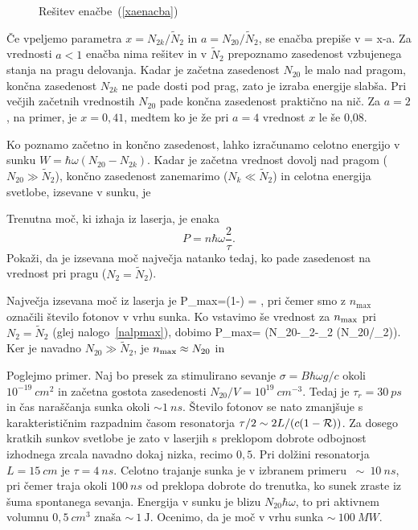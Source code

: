 \begin{figure}[h]
\centering
\def\svgwidth{90truemm} 

\caption{Rešitev enačbe~(\ref{xaenacba})}
\label{fig:Qeq}
\end{figure}

Če vpeljemo parametra $x=N_{2k}/\tilde{N}_2$ in $a=N_{20}/\tilde{N}_{2}$, se
enačba prepiše v 
\beq
\ln {}= x-a.
\eeq
Za vrednosti $a<1$ enačba nima rešitev in 
v $\tilde{N}_{2}$ prepoznamo zasedenost vzbujenega stanja na pragu delovanja. Kadar je začetna 
zasedenost $N_{20}$ le malo nad pragom, končna zasedenost $N_{2k}$ ne pade 
dosti pod prag, zato je izraba energije slabša. Pri večjih začetnih vrednostih 
$N_{20}$ pade končna zasedenost praktično na nič. Za $a=2$, na primer,
je $x=0,41$, medtem ko je že pri $a=4$ vrednost $x$ le še 0,08. 

Ko poznamo začetno in končno zasedenost, lahko izračunamo 
celotno energijo v sunku $W=\hbar \omega (N_{20}-N_{2k})$. Kadar je začetna vrednost
dovolj nad pragom ($N_{20}\gg\tilde{N}_{2}$), končno zasedenost zanemarimo ($N_{k}\ll\tilde{N}_{2}$) in 
celotna energija svetlobe, izsevane v sunku, je 
\begin{definition}
\label{nalpmax}
Trenutna moč, ki izhaja iz laserja, je enaka 
\begin{equation}
P=n \hbar \omega \frac{2}{\tau}.
\end{equation}
Pokaži, da je izsevana moč največja natanko tedaj, ko pade zasedenost na vrednost pri 
pragu ($N_{2}=\tilde{N}_{2}$). 
\end{definition}

Največja izsevana moč iz laserja je 
\beq
P_{\rm max}=\left(1-\right) = 
,
\eeq
pri čemer smo z $n_\textrm{max}$ označili število fotonov v vrhu sunka. 
Ko vstavimo še vrednost za $n_{\rm max}$ pri $N_{2}=\tilde{N}_{2}$ (glej 
nalogo~\ref{nalpmax}), dobimo
\beq
P_{\rm max}=\frac {2\hbar \omega}{\tau} \left(N_{20}-_{2}-_{2}
\ln (N_{20}/_{2})\right).
\eeq
Ker je navadno $N_{20}\gg \tilde{N}_2$, je $n_{\rm max} \approx N_{20}$
in 

Poglejmo primer. Naj bo presek za stimulirano sevanje $\sigma=B\hbar \omega g/c$ 
okoli $10^{-19}~\si{cm}^{2}$ in začetna gostota zasedenosti $N_{20}/V=10^{19}~\si{cm}^{-3}$.
Tedaj je $\tau_{r}=30~\si{ps}$ in čas naraščanja
sunka okoli $\sim 1~\si{ns}$. Število fotonov se nato zmanjšuje s
karakterističnim razpadnim časom resonatorja $\tau /2\sim 2L/(c(1-{\cal R}))$. 
Za dosego kratkih sunkov svetlobe je zato v laserjih s preklopom dobrote odbojnost 
izhodnega zrcala navadno dokaj nizka, recimo $0,5$. Pri dolžini resonatorja 
$L=15~\si{cm}$ je $\tau=4~\si{ns}$.
Celotno trajanje sunka je v izbranem primeru $~\sim~10~\si{ns}$, pri
čemer traja okoli $100~\si{ns}$ od preklopa dobrote do trenutka, ko sunek zraste iz šuma
spontanega sevanja. Energija v sunku je blizu $N_{20}\hbar \omega $, to pri
aktivnem volumnu $0,5~\si{cm}^3$ znaša $\sim~1~\si{\joule}$. Ocenimo, da je
moč v vrhu sunka $\sim~100~\si{MW}$.

